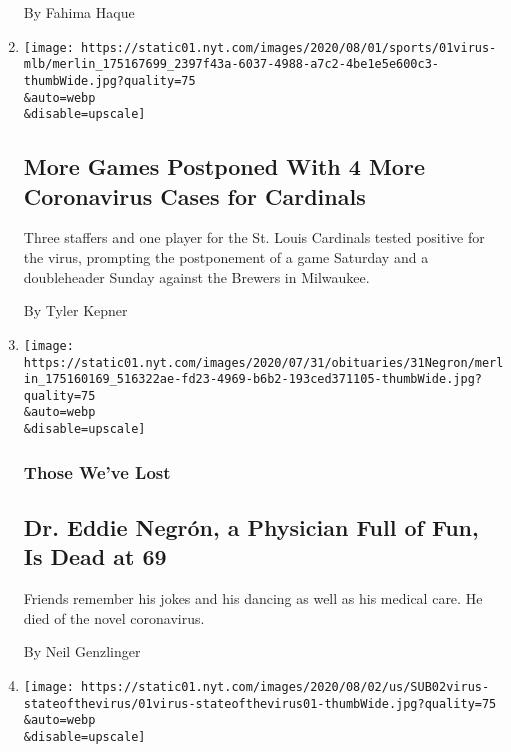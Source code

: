 \begin{enumerate}
  By Fahima Haque
\item
  \href{/2020/08/01/sports/baseball/coronavirus-cardinals.html}{}

  \texttt{[image: https://static01.nyt.com/images/2020/08/01/sports/01virus-mlb/merlin\_175167699\_2397f43a-6037-4988-a7c2-4be1e5e600c3-thumbWide.jpg?quality=75\\\&auto=webp\\\&disable=upscale]}

  \hypertarget{more-games-postponed-with-4-more-coronavirus-cases-for-cardinals}{%
  \subsection{More Games Postponed With 4 More Coronavirus Cases for
  Cardinals}\label{more-games-postponed-with-4-more-coronavirus-cases-for-cardinals}}

  Three staffers and one player for the St. Louis Cardinals tested
  positive for the virus, prompting the postponement of a game Saturday
  and a doubleheader Sunday against the Brewers in Milwaukee.

  By Tyler Kepner
\item
  \href{/2020/08/01/obituaries/eddie-negron-dead-coronavirus.html}{}

  \texttt{[image: https://static01.nyt.com/images/2020/07/31/obituaries/31Negron/merlin\_175160169\_516322ae-fd23-4969-b6b2-193ced371105-thumbWide.jpg?quality=75\\\&auto=webp\\\&disable=upscale]}

  \hypertarget{those-weve-lost-1}{%
  \subsubsection{Those We've Lost}\label{those-weve-lost-1}}

  \hypertarget{dr-eddie-negruxf3n-a-physician-full-of-fun-is-dead-at-69}{%
  \subsection{Dr. Eddie Negrón, a Physician Full of Fun, Is Dead at
  69}\label{dr-eddie-negruxf3n-a-physician-full-of-fun-is-dead-at-69}}

  Friends remember his jokes and his dancing as well as his medical
  care. He died of the novel coronavirus.

  By Neil Genzlinger
\item
  \href{/2020/08/01/us/coronavirus-midwest-cases-deaths.html}{}

  \texttt{[image: https://static01.nyt.com/images/2020/08/02/us/SUB02virus-stateofthevirus/01virus-stateofthevirus01-thumbWide.jpg?quality=75\\\&auto=webp\\\&disable=upscale]}


\end{enumerate}
